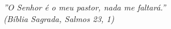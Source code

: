\begin{epigrafe}
    \vspace*{\fill}
	\begin{flushright}
		\textit{”O Senhor é o meu pastor, nada me faltará.”\\
		(Bíblia Sagrada, Salmos 23, 1)}
	\end{flushright}
\end{epigrafe}